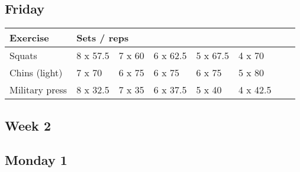 \documentclass[12pt, a4paper]{article}%
\begin{document}
  \subsection*{\hspace{0.5em} Friday }


  \begin{tabular}{l|lllllll}
  \hspace{0.75em} \textbf{Exercise} & \multicolumn{ 7 }{l}{ \textbf{Sets / reps} } \\ \hline

            \hspace{0.75em} Squats
            & 8 x 57.5
            & 7 x 60
            & 6 x 62.5
            & 5 x 67.5
            & 4 x 70
            & 
            & 
            \\


            \hspace{0.75em} Chins (light)
            & 7 x 70
            & 6 x 75
            & 6 x 75
            & 6 x 75
            & 5 x 80
            & 
            & 
            \\


            \hspace{0.75em} Military press
            & 8 x 32.5
            & 7 x 35
            & 6 x 37.5
            & 5 x 40
            & 4 x 42.5
            & 
            & 
            \\


  \end{tabular}


\clearpage \subsection*{\hspace{0.25em} Week 2 }
  \subsection*{\hspace{0.5em} Monday 1 }
\end{document}
